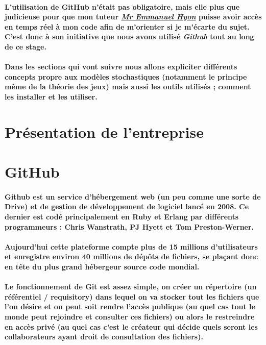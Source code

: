 \documentclass[a4paper, 12pt, twoside]{article}
\begin{document}
\paragraph{L'utilisation de GitHub n'était pas obligatoire, mais elle plus que judicieuse pour que mon tuteur \underline{\textit{Mr Emmanuel Hyon}} puisse avoir accès en temps réel à mon code afin de m'orienter si je m'écarte du sujet. C'est donc à son initiative que nous avons utilisé \textit{Github} tout au long de ce stage.}
\paragraph{Dans les sections qui vont suivre nous allons expliciter différents concepts propre aux modèles stochastiques (notamment le principe même de la théorie des jeux) mais aussi les outils utilisés ; comment les installer et les utiliser. }


\section{Présentation de l'entreprise}


\section{GitHub}
\paragraph{Github est un service d'hébergement web (un peu comme une sorte de Drive) et de gestion de développement de logiciel lancé en 2008.
Ce dernier est codé principalement en Ruby et Erlang par différents programmeurs : Chris Wanstrath, PJ Hyett et Tom Preston-Werner.}

\paragraph{Aujourd'hui cette plateforme compte plus de 15 millions d'utilisateurs et enregistre environ 40 millions de dépôts de fichiers,
se plaçant donc en tête du plus grand hébergeur source code mondial.}

\paragraph{Le fonctionnement de Git est assez simple, on créer un répertoire (un référentiel / requisitory) dans lequel on va stocker tout les fichiers que l'on désire et on peut soit rendre l'accès publique (au quel cas tout le monde peut rejoindre et consulter ces fichiers) ou alors le  restreindre en accès privé (au quel cas c'est le créateur qui décide quels seront les collaborateurs ayant droit de consultation des fichiers).}
\end{document}
